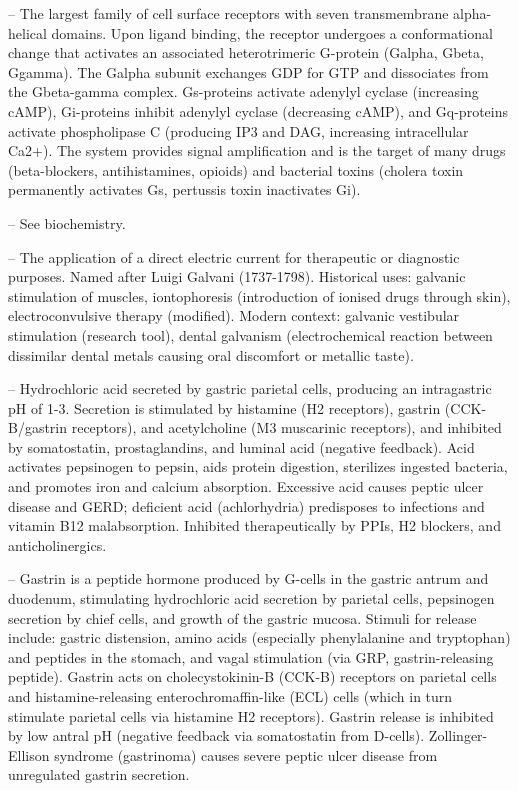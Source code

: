 -- The largest family of cell surface receptors with seven transmembrane alpha-helical domains. Upon ligand binding, the receptor undergoes a conformational change that activates an associated heterotrimeric G-protein (Galpha, Gbeta, Ggamma). The Galpha subunit exchanges GDP for GTP and dissociates from the Gbeta-gamma complex. Gs-proteins activate adenylyl cyclase (increasing cAMP), Gi-proteins inhibit adenylyl cyclase (decreasing cAMP), and Gq-proteins activate phospholipase C (producing IP3 and DAG, increasing intracellular Ca2+). The system provides signal amplification and is the target of many drugs (beta-blockers, antihistamines, opioids) and bacterial toxins (cholera toxin permanently activates Gs, pertussis toxin inactivates Gi).

-- See biochemistry.

-- The application of a direct electric current for therapeutic or diagnostic purposes. Named after Luigi Galvani (1737-1798). Historical uses: galvanic stimulation of muscles, iontophoresis (introduction of ionised drugs through skin), electroconvulsive therapy (modified). Modern context: galvanic vestibular stimulation (research tool), dental galvanism (electrochemical reaction between dissimilar dental metals causing oral discomfort or metallic taste).

-- Hydrochloric acid secreted by gastric parietal cells, producing an intragastric pH of 1-3. Secretion is stimulated by histamine (H2 receptors), gastrin (CCK-B/gastrin receptors), and acetylcholine (M3 muscarinic receptors), and inhibited by somatostatin, prostaglandins, and luminal acid (negative feedback). Acid activates pepsinogen to pepsin, aids protein digestion, sterilizes ingested bacteria, and promotes iron and calcium absorption. Excessive acid causes peptic ulcer disease and GERD; deficient acid (achlorhydria) predisposes to infections and vitamin B12 malabsorption. Inhibited therapeutically by PPIs, H2 blockers, and anticholinergics.

-- Gastrin is a peptide hormone produced by G-cells in the gastric antrum and duodenum, stimulating hydrochloric acid secretion by parietal cells, pepsinogen secretion by chief cells, and growth of the gastric mucosa. Stimuli for release include: gastric distension, amino acids (especially phenylalanine and tryptophan) and peptides in the stomach, and vagal stimulation (via GRP, gastrin-releasing peptide). Gastrin acts on cholecystokinin-B (CCK-B) receptors on parietal cells and histamine-releasing enterochromaffin-like (ECL) cells (which in turn stimulate parietal cells via histamine H2 receptors). Gastrin release is inhibited by low antral pH (negative feedback via somatostatin from D-cells). Zollinger-Ellison syndrome (gastrinoma) causes severe peptic ulcer disease from unregulated gastrin secretion.

